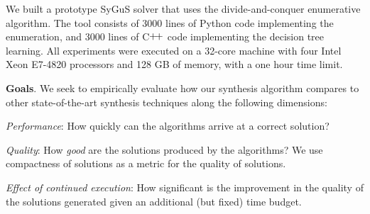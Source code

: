 \documentclass{llncs}
\newcommand{\sygus}{{\sffamily\fontsize{8.5}{10}\selectfont
    SyGuS}\xspace}
\newcommand{\dcsolve}{{\sffamily\fontsize{8.5}{10}\selectfont
    DCSolve}\xspace}
\renewcommand{\paragraph}[1]{\par\noindent\textbf{#1}.}
\begin{document}
We built a prototype \sygus solver that uses the divide-and-conquer
enumerative algorithm.
The tool consists of 3000 lines of Python code implementing the
enumeration, and 3000 lines of C$\raisebox{1pt}{+\!+}$ code implementing
the decision tree learning.
All experiments were executed on a
32-core machine with four Intel Xeon E7-4820 processors
and 128 GB of memory, with a one hour time limit.

\paragraph{Goals}
We seek to empirically evaluate how our synthesis algorithm compares
to other state-of-the-art synthesis techniques along the following
dimensions:
\begin{inparaenum}[(a)]
\item
\emph{Performance}: How quickly can the algorithms arrive at a correct
solution?
\item
\emph{Quality}: How \emph{good} are the solutions produced by the
algorithms? We use compactness of solutions
as a metric for the quality of solutions.
\item
\emph{Effect of continued execution}: How significant is the
improvement in the quality of the solutions generated
given an additional (but fixed) time budget.
\end{inparaenum}

\end{document}
